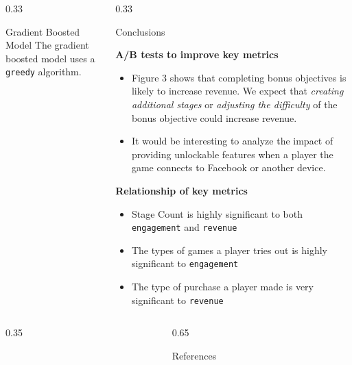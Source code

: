 \documentclass[final,size=a3]{beamer}
\newlength{\threecolwid}
\begin{document}
\begin{frame}[t]
\begin{columns}[t]
\begin{column}{\threecolwid}
\begin{columns}[t]
\begin{column}{0.33\threecolwid}
\begin{block}{Gradient Boosted Model}
\vspace{-2mm}
The gradient boosted model uses a \texttt{greedy} algorithm.

\end{block}

\end{column} %

\begin{column}{0.33\threecolwid}

\begin{block}{Conclusions}

\textbf{A/B tests to improve key metrics}
%
\begin{itemize}
\item Figure 3 shows that completing bonus objectives is likely to increase revenue. We expect that \textit{creating additional stages} or \textit{adjusting the difficulty} of the bonus objective could increase revenue.
\item It would be interesting to analyze the impact of providing unlockable features when a player the game connects to Facebook or another device.
\end{itemize}

\textbf{Relationship of key metrics}
%
\begin{itemize}
\item Stage Count is highly significant to both \texttt{engagement} and \texttt{revenue}
\item The types of games a player tries out is highly significant to \texttt{engagement}
\item The type of purchase a player made is very significant to \texttt{revenue}
\end{itemize}

\end{block}

\end{column}

\end{columns} %

\begin{columns} %

\begin{column}{0.35\threecolwid}


\end{column}

\begin{column}{0.65\threecolwid}

\vspace{-85mm}
\begin{alertblock}{References}


\end{alertblock}
\end{column}
\end{columns}
\end{column}
\end{columns}
\end{frame}
\end{document}
